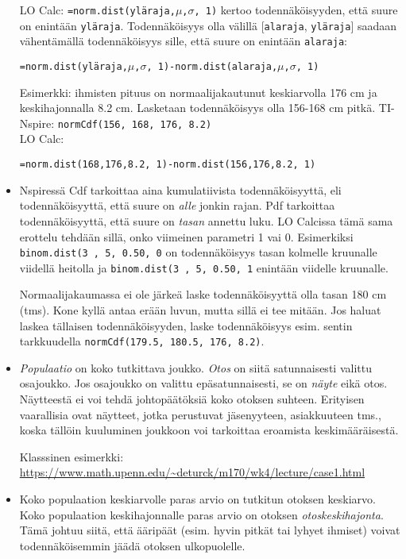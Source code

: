\documentclass[12pt,leqno,a4paper,oneside]{amsart}
\theoremstyle{definition}
\theoremstyle{remark}
\numberwithin{equation}{section}
\begin{document}
\begin{itemize}
 LO Calc: \texttt{=norm.dist(yläraja,$\mu$,$\sigma$, 1)} kertoo toden\-näköisyyden, että suure on enintään \texttt{yläraja}. Toden\-näköisyys
 olla välillä [\texttt{alaraja}, \texttt{yläraja}] saadaan vähentämällä todennäköisyys sille, että suure on enintään \texttt{alaraja}:
 \begin{center}
  \mbox{\texttt{=norm.dist(yläraja,$\mu$,$\sigma$, 1)-norm.dist(alaraja,$\mu$,$\sigma$, 1)}}
 \end{center}
 
 Esimerkki: ihmisten pituus on normaalijakautunut keskiarvolla 176 cm ja keskihajonnalla 8.2 cm. Lasketaan todennäköisyys olla 156-168 cm pitkä.
 TI-Nspire: \texttt{normCdf(156, 168, 176, 8.2)}\\
 LO Calc:\\
\begin{center}
  \mbox{\texttt{=norm.dist(168,176,8.2, 1)-norm.dist(156,176,8.2, 1)}}
 \end{center}
 
 \item
 Nspiressä Cdf tarkoittaa aina kumulatiivista todennäköisyyttä, eli todennäköisyyttä, että suure on \emph{alle} jonkin rajan. Pdf tarkoittaa
 todennäköisyyttä, että suure on \emph{tasan} annettu luku. LO Calcissa tämä sama erottelu tehdään sillä, onko viimeinen parametri 1 vai 0. Esimerkiksi
 \texttt{binom.dist(3 , 5, 0.50, 0} on todennäköisyys tasan kolmelle kruunalle viidellä heitolla ja \texttt{binom.dist(3 , 5, 0.50, 1} enintään
 viidelle kruunalle.
 
 Normaalijakaumassa ei ole järkeä laske todennäköisyyttä olla tasan 180 cm (tms). Kone kyllä antaa erään luvun, mutta sillä ei tee mitään. Jos 
 haluat laskea tällaisen todennäköisyyden, laske todennäköisyys esim. sentin tarkkuudella \texttt{normCdf(179.5, 180.5, 176, 8.2)}.

 \item
 \emph{Populaatio} on koko tutkittava joukko. \emph{Otos} on siitä satunnaisesti valittu osajoukko. Jos osajoukko on valittu epäsatunnaisesti, se on \emph{näyte} eikä
 otos. Näytteestä ei voi tehdä johtopäätöksiä koko otoksen suhteen. Erityisen vaarallisia ovat näytteet, jotka perustuvat jäsenyyteen, asiakkuuteen tms.,
 koska tällöin kuuluminen joukkoon voi tarkoittaa eroamista keskimääräisestä.
 
 Klasssinen esimerkki: \url{https://www.math.upenn.edu/~deturck/m170/wk4/lecture/case1.html}
 
 \item
 Koko populaation keskiarvolle paras arvio on tutkitun otoksen keskiarvo. Koko populaation keskihajonnalle paras arvio on otoksen \emph{otoskeskihajonta}.
 Tämä johtuu siitä, että ääripäät (esim. hyvin pitkät tai lyhyet ihmiset) voivat todennäköisemmin jäädä otoksen ulkopuolelle.
 

\end{itemize}
\end{document}

